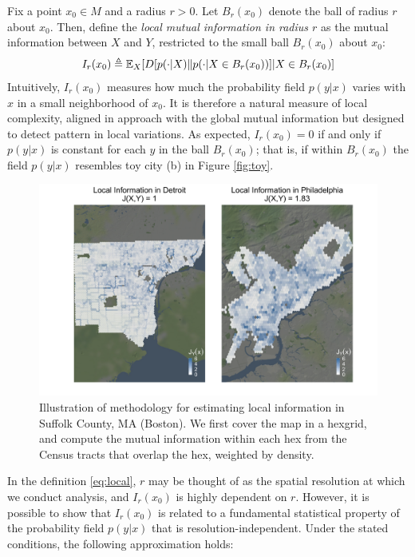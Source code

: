 		Fix a point $x_0 \in M$ and a radius $r > 0$. Let $B_r(x_0)$ denote the ball of radius $r$ about $x_0$. Then, define the \emph{local mutual information in radius $r$} as the mutual information between $X$ and $Y$, restricted to the small ball $B_r(x_0)$ about $x_0$:
		\begin{equation}
			I_r(x_0) \triangleq \mathbb{E}_X[D[p(\cdot|X)\| p(\cdot|X \in B_r(x_0))]|X \in B_r(x_0)] \label{eq:local}
		\end{equation}
		Intuitively, $I_r(x_0)$ measures how much the probability field $p(y|x)$ varies with $x$ in a small neighborhood of $x_0$. It is therefore a natural measure of local complexity, aligned in approach with the global mutual information but designed to detect pattern in local variations. As expected, $I_r(x_0) = 0$ if and only if $p(y|x)$ is constant for each $y$ in the ball $B_r(x_0)$; that is, if within $B_r(x_0)$ the field $p(y|x)$ resembles toy city (b) in Figure \ref{fig:toy}. 

		\begin{figure}
			\centering
			\includegraphics[width=.5\textwidth]{figs/method_illustration.png}
			\caption{Illustration of methodology for estimating local information in Suffolk County, MA (Boston). We first cover the map in a hexgrid, and compute the mutual information within each hex from the Census tracts that overlap the hex, weighted by density. }
			\label{fig:method}
		\end{figure}

		In the definition \eqref{eq:local}, $r$ may be thought of as the spatial resolution at which we conduct analysis, and $I_r(x_0)$ is highly dependent on $r$. However, it is possible to show that $I_r(x_0)$ is related to a fundamental statistical property of the probability field $p(y|x)$ that is resolution-independent. Under the stated conditions, the following approximation holds: 

